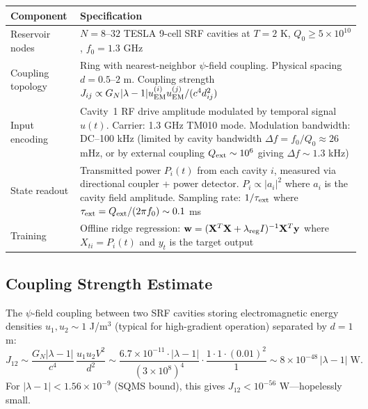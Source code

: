\documentclass[11pt]{article}
\theoremstyle{definition}
\theoremstyle{remark}
\newcommand{\ee}[1]{\times 10^{#1}}
\begin{document}
\begin{center}
\begin{tabular}{p{3cm}p{9cm}}
\toprule
\textbf{Component} & \textbf{Specification} \\
\midrule
Reservoir nodes & $N = 8$--$32$ TESLA 9-cell SRF cavities at
  $T = 2$ K, $Q_0 \geq 5 \ee{10}$, $f_0 = 1.3$ GHz \\
Coupling topology & Ring with nearest-neighbor $\psi$-field coupling.
  Physical spacing $d = 0.5$--$2$ m. Coupling strength
  $J_{ij} \propto G_N |\lambda - 1| u_{\rm EM}^{(i)} u_{\rm EM}^{(j)}
  / (c^4 d_{ij}^2)$ \\
Input encoding & Cavity~1 RF drive amplitude modulated by temporal
  signal $u(t)$. Carrier: 1.3 GHz TM010 mode. Modulation bandwidth:
  DC--100 kHz (limited by cavity bandwidth $\Delta f = f_0/Q_0 \approx
  26$ mHz, or by external coupling $Q_{\rm ext} \sim 10^6$ giving
  $\Delta f \sim 1.3$ kHz) \\
State readout & Transmitted power $P_i(t)$ from each cavity $i$,
  measured via directional coupler + power detector.
  $P_i \propto |a_i|^2$ where $a_i$ is the cavity field amplitude.
  Sampling rate: $1/\tau_{\rm ext}$ where $\tau_{\rm ext}
  = Q_{\rm ext}/(2\pi f_0) \sim 0.1$ ms \\
Training & Offline ridge regression:
  $\mathbf{w} = (\mathbf{X}^T \mathbf{X} + \lambda_{\rm reg} I)^{-1}
  \mathbf{X}^T \mathbf{y}$ where $X_{ti} = P_i(t)$ and $y_t$
  is the target output \\
\bottomrule
\end{tabular}
\end{center}

\subsection{Coupling Strength Estimate}

The $\psi$-field coupling between two SRF cavities storing
electromagnetic energy densities $u_1, u_2 \sim 1$ J/m$^3$
(typical for high-gradient operation) separated by $d = 1$ m:
\begin{equation}
  J_{12} \sim \frac{G_N |\lambda - 1|}{c^4}\,
  \frac{u_1 u_2 V^2}{d^2}
  \sim \frac{6.7 \ee{-11} \cdot |\lambda - 1|}{(3 \ee{8})^4}
  \cdot \frac{1 \cdot 1 \cdot (0.01)^2}{1}
  \sim 8 \ee{-48}\,|\lambda - 1| \;\text{W}.
  \label{eq:J12}
\end{equation}
For $|\lambda - 1| < 1.56 \ee{-9}$ (SQMS bound), this gives
$J_{12} < 10^{-56}$ W---hopelessly small.
\end{document}
